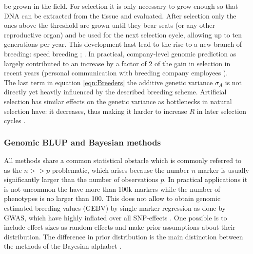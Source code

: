 be grown in the field. For selection it is only necessary to grow enough so that DNA can be extracted from the
tissue and evaluated. After selection only the ones above the threshold are grown until they bear seats (or
any other reproductive organ) and be used for the next selection cycle, allowing up to ten generations per
year. This development hast lead to the rise to a new branch of breeding: speed breeding
\cite{ghosh2018speed}; \cite{watson2018speed}. In practical, company-level genomic prediction as largely
contributed to an increase by a factor of 2 of the gain in selection in recent years (personal
communication with breeding company employees ).\\ The last term in equation \ref{eqn:Breeders} the additive genetic variance $\sigma_A$
is not directly yet heavily influenced by the described breeding scheme. Artificial selection has similar
effects on the genetic variance as bottlenecks in natural selection have: it decreases, thus making it harder
to increase $R$ in later selection cycles \cite{walsh2018}.


\subsubsection{Genomic BLUP and Bayesian methods}\label{blup:bayes}

All methods share a common statistical obstacle which is commonly referred to as the $n >> p$ problematic,
which arises because the number $n$ marker is usually significantly larger than the number of observations
$p$. In practical applications it is not uncommon the have more than 100k markers while the number of
phenotypes is no larger than 100. This does not allow to obtain genomic estimated breeding values (GEBV) by
single marker regression as done by GWAS, which have highly inflated over all SNP-effects
\cite{korte2013advantages}. One possible is to include effect sizes as random effects and make prior
assumptions about their distribution. The difference in prior distribution is the main distinction between the
methods of the Bayesian alphabet
\cite{gianola2013}.\\

